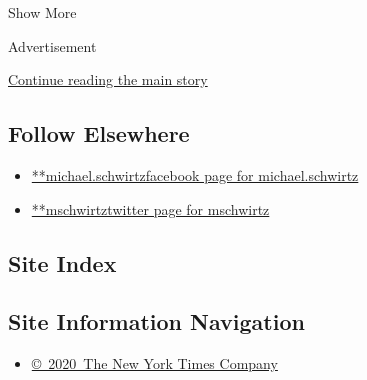 Show More

Advertisement

\protect\hyperlink{after-mid2}{Continue reading the main story}

\hypertarget{follow-elsewhere}{%
\subsection{Follow Elsewhere}\label{follow-elsewhere}}

\begin{itemize}
\tightlist
\item
  \href{https://www.facebookcorewwwi.onion/michael.schwirtz}{**michael.schwirtzfacebook
  page for michael.schwirtz}
\item
  \href{https://twitter.com/mschwirtz}{**mschwirtztwitter page for
  mschwirtz}
\end{itemize}

\hypertarget{site-index}{%
\subsection{Site Index}\label{site-index}}

\hypertarget{site-information-navigation}{%
\subsection{Site Information
Navigation}\label{site-information-navigation}}

\begin{itemize}
\tightlist
\item
  \href{https://help.nytimes3xbfgragh.onion/hc/en-us/articles/115014792127-Copyright-notice}{©~2020~The
  New York Times Company}
\end{itemize}

